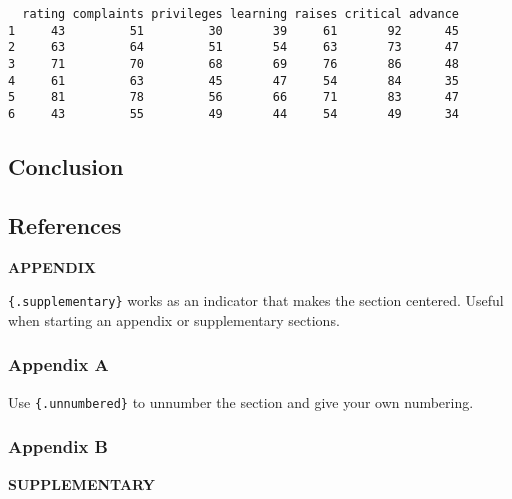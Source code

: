 \documentclass[
  11pt]{article}
\begin{document}
\begin{verbatim}
  rating complaints privileges learning raises critical advance
1     43         51         30       39     61       92      45
2     63         64         51       54     63       73      47
3     71         70         68       69     76       86      48
4     61         63         45       47     54       84      35
5     81         78         56       66     71       83      47
6     43         55         49       44     54       49      34
\end{verbatim}

\subsection{Conclusion}\label{sec-conc}

\subsection*{References}\label{references}

\renewcommand{\bibsection}{}


\label{appendix}
\bigskip

\begin{center}

{\large\bf APPENDIX}

\end{center}

\texttt{\{.supplementary\}} works as an indicator that makes the section
centered. Useful when starting an appendix or supplementary sections.

\subsubsection*{Appendix A}\label{appendix-a}

Use \texttt{\{.unnumbered\}} to unnumber the section and give your own
numbering.

\subsubsection*{Appendix B}\label{appendix-b}

\label{supplementary}
\bigskip

\begin{center}

{\large\bf SUPPLEMENTARY}

\end{center}
\end{document}
